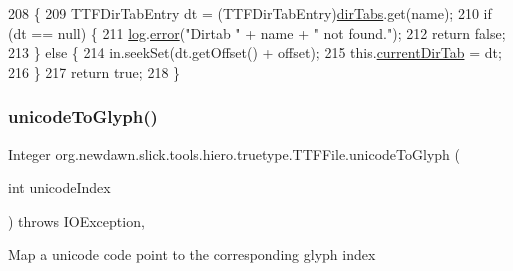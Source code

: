 \begin{DoxyCode}
208                                                   \{
209         TTFDirTabEntry dt = (TTFDirTabEntry)\mbox{\hyperlink{classorg_1_1newdawn_1_1slick_1_1tools_1_1hiero_1_1truetype_1_1_t_t_f_file_ace74820d11ce19f9c04797c2715ac728}{dirTabs}}.get(name);
210         \textcolor{keywordflow}{if} (dt == null) \{
211             \mbox{\hyperlink{classorg_1_1newdawn_1_1slick_1_1tools_1_1hiero_1_1truetype_1_1_t_t_f_file_ae6acbd4aea68fd8cf15305aa535993f4}{log}}.\mbox{\hyperlink{classorg_1_1newdawn_1_1slick_1_1tools_1_1hiero_1_1truetype_1_1_log_a96beac00c7fa5c2e86ba2070bff78b56}{error}}(\textcolor{stringliteral}{"Dirtab "} + name + \textcolor{stringliteral}{" not found."});
212             \textcolor{keywordflow}{return} \textcolor{keyword}{false};
213         \} \textcolor{keywordflow}{else} \{
214             in.seekSet(dt.getOffset() + offset);
215             this.\mbox{\hyperlink{classorg_1_1newdawn_1_1slick_1_1tools_1_1hiero_1_1truetype_1_1_t_t_f_file_acf28b142db59983cc93fba28f230228d}{currentDirTab}} = dt;
216         \}
217         \textcolor{keywordflow}{return} \textcolor{keyword}{true};
218     \}
\end{DoxyCode}
\mbox{\label{classorg_1_1newdawn_1_1slick_1_1tools_1_1hiero_1_1truetype_1_1_t_t_f_file_a32307b9061a332f3bf5bc5a8a3f1543f}} 
\subsubsection{\texorpdfstring{unicode\+To\+Glyph()}{unicodeToGlyph()}}
{\footnotesize\ttfamily Integer org.\+newdawn.\+slick.\+tools.\+hiero.\+truetype.\+T\+T\+F\+File.\+unicode\+To\+Glyph (\begin{DoxyParamCaption}\item[{int}]{unicode\+Index }\end{DoxyParamCaption}) throws I\+O\+Exception\hspace{0.3cm}{\ttfamily [inline]}, {\ttfamily [private]}}

Map a unicode code point to the corresponding glyph index


